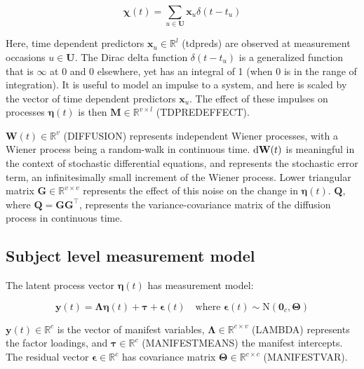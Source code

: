 \documentclass[nojss]{jss}\usepackage[]{graphicx}\usepackage[]{color}
\newcommand{\vect}[1]{\boldsymbol{\mathbf{#1}}}
\begin{document}
\begin{equation}
\label{eq:spike}
\vect{\chi} (t) = \sum_{ u \in \vect{U}}  \vect{x}_{u} \delta (t-t_u)     
\end{equation}

Here, time dependent predictors $\vect{x}_u \in \mathbb{R}^{l}$ (tdpreds) are observed at measurement occasions $ u \in \vect{U}$. The Dirac delta function $\delta(t-t_u)$ is a generalized function that is $\infty$ at 0 and 0 elsewhere, yet has an integral of 1 (when 0 is in the range of integration). It is useful to model an impulse to a system, and here is scaled by the vector of time dependent predictors $\vect{x}_u$.  The effect of these impulses on processes $\vect{\eta}(t)$ is then $\vect{M}\in \mathbb{R}^{v \times l}$ (TDPREDEFFECT). 

$\vect{W}(t) \in \mathbb{R}^{v}$ (DIFFUSION) represents independent Wiener processes, with a Wiener process being a random-walk in continuous time. $\textnormal{d}\vect{W}(t)$ is meaningful in the context of stochastic differential equations, and represents the stochastic error term, an infinitesimally small increment of the Wiener process. Lower triangular matrix $\vect{G} \in \mathbb{R}^{v \times v}$ represents the effect of this noise on the change in  $\vect{\eta}(t)$.  $\vect{Q}$, where $\vect{Q} = \vect{GG}^\top$, represents the variance-covariance matrix of the diffusion process in continuous time.

\subsection{Subject level measurement model}
The latent process vector $\vect{\eta}(t)$ has measurement model:

\begin{equation}
	\label{eq:measurement}
	\vect{y}(t) = \vect{\Lambda} \vect{\eta}(t) + \vect{\tau} + \vect{\epsilon}(t)  
	\quad \text{where } \vect{\epsilon}(t) \sim  \mathrm{N} (\vect{0}_c, \vect{\Theta})
\end{equation}

$\vect{y} (t)\in\mathbb{R}^{c}$ is the vector of manifest variables, $\vect{\Lambda} \in \mathbb{R}^{c \times v}$ (LAMBDA) represents the factor loadings, and $\vect{\tau} \in\mathbb{R}^{c}$ (MANIFESTMEANS) the manifest intercepts. The residual vector $\vect{\epsilon} \in \mathbb{R}^{c}$ has covariance matrix $\vect{\Theta} \in\mathbb{R}^{c \times c}$ (MANIFESTVAR).
\end{document}
